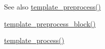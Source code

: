 \begin{DoxySeeAlso}{See also}
\hyperlink{includes_2theme_8inc_a3eeb7bcdba7ef4859f99586da264d347}{template\_\-preprocess()} 

\hyperlink{block_8module_af4bcb538ddb98ffdd9ec8037631f10fa}{template\_\-preprocess\_\-block()} 

\hyperlink{includes_2theme_8inc_a9b4d56c55dab2c59b7af6f71d6b1a940}{template\_\-process()} 
\end{DoxySeeAlso}
